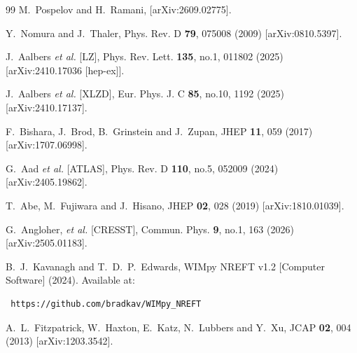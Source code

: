 \documentclass[notitlepage,floats,aps,nofootinbib,preprintnumbers,twocolumn,prl,10pt,balancelastpage]{revtex4-1}
\begin{document}
\begin{thebibliography}{99}
M.~Pospelov and H.~Ramani,
[arXiv:2609.02775].

Y.~Nomura and J.~Thaler,
Phys. Rev. D \textbf{79}, 075008 (2009)
[arXiv:0810.5397].

J.~Aalbers \textit{et al.} [LZ],
Phys. Rev. Lett. \textbf{135}, no.1, 011802 (2025)
[arXiv:2410.17036 [hep-ex]].


J.~Aalbers \textit{et al.} [XLZD],
Eur. Phys. J. C \textbf{85}, no.10, 1192 (2025)
[arXiv:2410.17137].

F.~Bishara, J.~Brod, B.~Grinstein and J.~Zupan,
JHEP \textbf{11}, 059 (2017)
[arXiv:1707.06998].

G.~Aad \textit{et al.} [ATLAS],
Phys. Rev. D \textbf{110}, no.5, 052009 (2024)
[arXiv:2405.19862].


T.~Abe, M.~Fujiwara and J.~Hisano,
JHEP \textbf{02}, 028 (2019)
[arXiv:1810.01039].




G.~Angloher, \textit{et al.} [CRESST],
Commun. Phys. \textbf{9}, no.1, 163 (2026)
[arXiv:2505.01183].


B.~J.~Kavanagh and T.~D.~P.~Edwards, WIMpy NREFT v1.2 [Computer Software] (2024).
Available at: \begin{verbatim} https://github.com/bradkav/WIMpy_NREFT \end{verbatim}

A.~L.~Fitzpatrick, W.~Haxton, E.~Katz, N.~Lubbers and Y.~Xu,
JCAP \textbf{02}, 004 (2013)
[arXiv:1203.3542].


\end{thebibliography}
\end{document}
